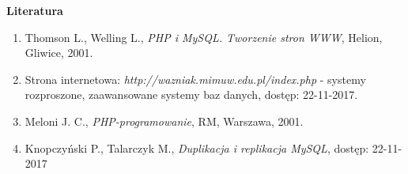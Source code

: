 \pagestyle {empty}

\vspace*{1.3cm}

{\Huge\textbf{Literatura}}

\vspace*{1cm}

\begin{enumerate}[\lbrack 1\rbrack]
	\item Thomson L., Welling L., \textit{PHP i MySQL. Tworzenie stron WWW}, Helion, Gliwice, 2001.
	\item Strona internetowa: \textit{http://wazniak.mimuw.edu.pl/index.php} - systemy rozproszone, zaawansowane
	systemy baz danych, dostęp: 22-11-2017. 
	\item Meloni J. C.,\textit{ PHP-programowanie}, RM, Warszawa, 2001.
	\item Knopczyński P., Talarczyk M., \textit{Duplikacja i replikacja MySQL}, dostęp: 22-11-2017
\end{enumerate}

